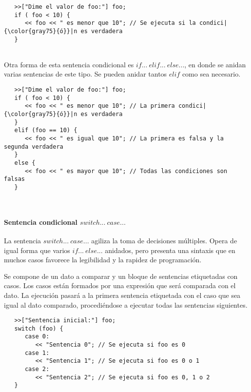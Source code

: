 \begin{lstlisting}
   >>["Dime el valor de foo:"] foo;
   if ( foo < 10) { 
      << foo << " es menor que 10"; // Se ejecuta si la condici|{\color{gray75}{ó}}|n es verdadera
   }
\end{lstlisting}
\hfill\\

Otra forma de esta sentencia condicional es $if...\ elif...\ else...$, en donde se anidan varias
sentencias de este tipo. Se pueden anidar tantos $elif$ como sea necesario.\\

\begin{lstlisting}
   >>["Dime el valor de foo:"] foo;
   if ( foo < 10) { 
      << foo << " es menor que 10"; // La primera condici|{\color{gray75}{ó}}|n es verdadera
   }
   elif (foo == 10) {
      << foo << " es igual que 10"; // La primera es falsa y la segunda verdadera
   }
   else {
      << foo << " es mayor que 10"; // Todas las condiciones son falsas
   }
\end{lstlisting}
\hfill\\

\paragraph{Sentencia condicional $switch...\ case...$}
La sentencia $switch...\ case...$ agiliza la toma de decisiones múltiples. Opera de igual forma que varios 
$if...\ else...$ anidados, pero presenta una sintaxis que en muchos casos favorece la legibilidad y 
la rapidez de programación.

Se compone de un dato a comparar y un bloque de sentencias etiquetadas con casos. Los casos están formados por una expresión que 
será comparada con el dato. La ejecución pasará a la primera sentencia etiquetada
con el caso que sea igual al dato comparado, procediéndose a ejecutar todas las sentencias siguientes. \\

\begin{lstlisting}
   >>["Sentencia inicial:"] foo;
   switch (foo) {
      case 0: 
         << "Sentencia 0"; // Se ejecuta si foo es 0
      case 1:
         << "Sentencia 1"; // Se ejecuta si foo es 0 o 1
      case 2:
         << "Sentencia 2"; // Se ejecuta si foo es 0, 1 o 2
   }
\end{lstlisting}
\hfill\\

